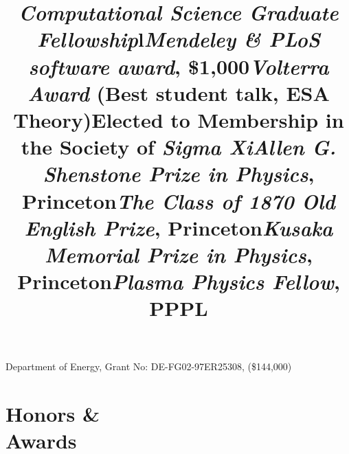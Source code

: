 \documentclass[margin]{res}
\begin{document}
\begin{resume}
\title{\emph{Computational Science Graduate Fellowship}}
\begin{position} 
  Department of Energy, Grant No: DE-FG02-97ER25308, (\$144,000)
  \vspace{-.25cm}
\end{position}


\section{Honors \& \\ Awards}
\begin{format}
\title{l}\\
\body
\end{format}


\title{\emph{Mendeley \& PLoS software award}, \$1,000}
\begin{position} \vspace{-.7cm} \end{position}

\title{\emph{Volterra Award} (Best student talk, ESA Theory)}
\begin{position} \vspace{-.7cm} \end{position}

\title{Elected to Membership in the Society of \emph{Sigma Xi}}
\begin{position}   \vspace{-.7cm} \end{position}

\title{\emph{Allen G. Shenstone Prize in Physics}, Princeton}
\begin{position}   \vspace{-.7cm} \end{position}

\title{\emph{The Class of 1870 Old English Prize},  Princeton}
\begin{position}   \vspace{-.7cm} \end{position}

\title{\emph{Kusaka Memorial Prize in Physics}, Princeton}
\begin{position}   \vspace{-.7cm} \end{position}

\title{\emph{Plasma Physics Fellow},  PPPL }
\begin{position}   \vspace{-.7cm} \end{position}



\end{resume}
\end{document}
